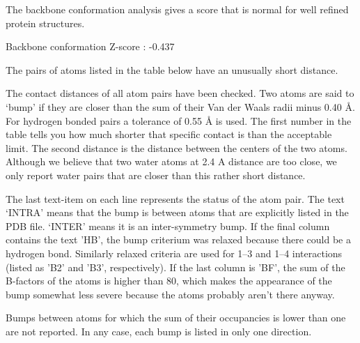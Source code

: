 \begin{note}
The backbone conformation analysis gives a score that is normal
for well refined protein structures.

\parbox{1\textwidth}{
 Backbone conformation Z-score : -0.437
}%

\end{note}

\begin{error}
The pairs of atoms listed in the table below have an unusually
short distance.

The contact distances of all atom pairs have been checked. Two
atoms are said to `bump' if they are closer than the sum of their
Van der Waals radii minus 0.40 {\AA}. For hydrogen bonded pairs
a tolerance of 0.55 {\AA} is used.  The first number in the
table tells you how much shorter that specific contact is than the
acceptable limit. The second distance is the distance between the
centers of the two atoms. Although we believe that two water atoms
at 2.4 A distance are too close, we only report water pairs that are
closer than this rather short distance.

The last text-item on each line represents the status of the atom
pair.  The text `INTRA' means that the bump is between atoms that
are explicitly listed in the PDB file. `INTER' means it is an
inter-symmetry bump. If the final column contains the text 'HB',
the bump criterium was relaxed because there could be a hydrogen
bond. Similarly relaxed criteria are used for 1--3 and 1--4
interactions (listed as 'B2' and 'B3', respectively). If the last
column is 'BF', the sum of the B-factors of the atoms is higher
than 80, which makes the appearance of the bump somewhat less
severe because the atoms probably aren't there anyway.

Bumps between atoms for which the sum of their occupancies is lower
than one are not reported. In any case, each bump is listed in only
one direction.



\end{error}
